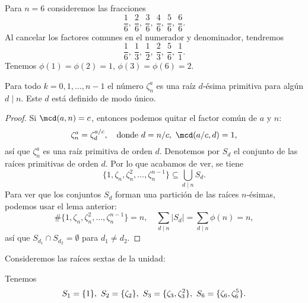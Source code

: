 \begin{ejemplo}
  Para $n = 6$ consideremos las fracciones
  $$\frac{1}{6}, ~ \frac{2}{6}, ~ \frac{3}{6}, ~ \frac{4}{6}, ~ \frac{5}{6}, ~ \frac{6}{6}.$$
  Al cancelar los factores comunes en el numerador y denominador, tendremos
  $$\frac{1}{6}, ~ \frac{1}{3}, ~ \frac{1}{2}, ~ \frac{2}{3}, ~ \frac{5}{6}, ~ \frac{1}{1}.$$
  Tenemos $\phi (1) = \phi (2) = 1$, $\phi (3) = \phi (6) = 2$.
\end{ejemplo}

\begin{proposicion}
  \label{prop:descomposicion-en-raices-primitivas}
  Para todo $k = 0,1,\ldots,n-1$ el número $\zeta_n^a$ es una raíz $d$-ésima
  primitiva para algún $d \mid n$. Este $d$ está definido de modo único.

  \begin{proof}
    Si $\mcd (a,n) = c$, entonces podemos quitar el factor común de $a$ y $n$:
    $$\zeta_n^a = \zeta_d^{a/c}, \quad \text{donde }d = n/c, ~ \mcd (a/c, d) = 1,$$
    así que $\zeta_n^a$ es una raíz primitiva de orden $d$. Denotemos por $S_d$
    el conjunto de las raíces primitivas de orden $d$. Por lo que acabamos de
    ver, se tiene
    $$\{ 1, \zeta_n, \zeta_n^2, \ldots, \zeta_n^{n-1} \} \subseteq \bigcup_{d\mid n} S_d.$$
    Para ver que los conjuntos $S_d$ forman una partición de las raíces
    $n$-ésimas, podemos usar el lema anterior:
    $$\# \{ 1, \zeta_n, \zeta_n^2, \ldots, \zeta_n^{n-1} \} = n, \quad \sum_{d\mid n} |S_d| = \sum_{d\mid n} \phi (n) = n,$$
    así que $S_{d_1} \cap S_{d_2} = \emptyset$ para $d_1 \ne d_2$.
  \end{proof}
\end{proposicion}

\begin{ejemplo}
  Consideremos las raíces sextas de la unidad:
  \begin{center}
  \end{center}
  Tenemos
  \[ S_1 = \{ 1 \}, ~ S_2 = \{ \zeta_2 \}, ~ S_3 = \{ \zeta_3, \zeta_3^2 \}, ~ S_6 = \{ \zeta_6, \zeta_6^5 \}. \qedhere \]
\end{ejemplo}

